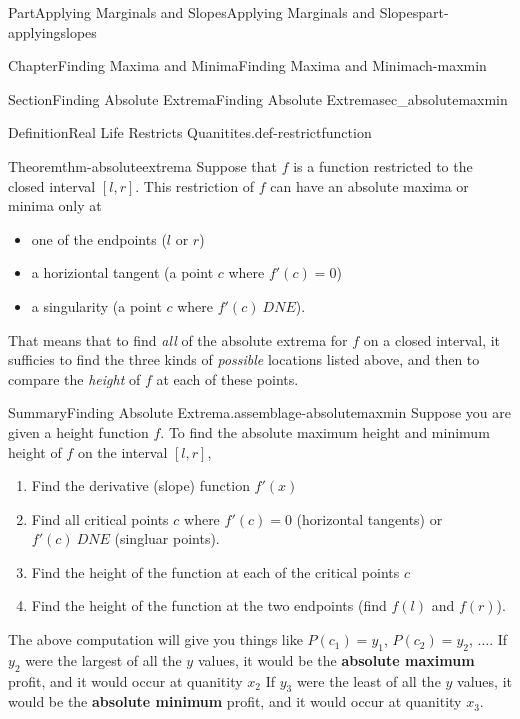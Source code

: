 \documentclass[oneside,10pt,]{tufte-book}
\newcommand{\terminology}[1]{\textbf{#1}}
\numberwithin{equation}{chapter}
\begin{document}
\begin{partptx}{Part}{Applying Marginals and Slopes}{}{Applying Marginals and Slopes}{}{}{part-applyingslopes}
\begin{chapterptx}{Chapter}{Finding Maxima and Minima}{}{Finding Maxima and Minima}{}{}{ch-maxmin}
\begin{sectionptx}{Section}{Finding Absolute Extrema}{}{Finding Absolute Extrema}{}{}{sec_absolutemaxmin}
\begin{definition}{Definition}{Real Life Restricts Quanitites.}{def-restrictfunction}
\begin{image}{0.25}{0.5}{0.25}{}
{
}%
\end{image}%
\end{definition}
\begin{theorem}{Theorem}{}{}{thm-absoluteextrema}%
Suppose that \(f\) is a function restricted to the closed interval \([l,r]\). This restriction of \(f\) can have an absolute maxima or minima only at%
\begin{itemize}[label=\textbullet]
\item{}one of the endpoints (\(l\) or \(r\))%
\item{}a horiziontal tangent (a point \(c\) where \(f'(c)=0\))%
\item{}a singularity (a point \(c\) where \(f'(c)\ DNE\)).%
\end{itemize}
%
\end{theorem}
That means that to find \emph{all} of the absolute extrema for \(f\) on a closed interval, it sufficies to find the three kinds of \emph{possible} locations listed above, and then to compare the \emph{height} of \(f\) at each of these points.%
\begin{assemblage}{Summary}{Finding Absolute Extrema.}{assemblage-absolutemaxmin}%
Suppose you are given a height function \(f\). To find the absolute maximum height and minimum height of \(f\) on the interval \([l,r]\),%
\begin{enumerate}
\item{}Find the derivative (slope) function \(f'(x)\)%
\item{}Find all critical points \(c\) where \(f'(c) = 0\) (horizontal tangents) or \(f'(c)\ DNE\) (singluar points).%
\item{}Find the height of the function at each of the critical points \(c\)%
\item{}Find the height of the function at the two endpoints (find \(f(l)\) and \(f(r)\)).%
\end{enumerate}
%
\par
The above computation will give you things like \(P(c_1) = y_1\), \(P(c_2) = y_2\), \(\dots\). If \(y_2\) were the largest of all the \(y\) values, it would be the \terminology{absolute maximum} profit, and it would occur at quanitity \(x_2\) If \(y_3\) were the least of all the \(y\) values, it would be the \terminology{absolute minimum} profit, and it would occur at quanitity \(x_3\).%

\end{assemblage}
\end{sectionptx}
\end{chapterptx}
\end{partptx}
\end{document}
